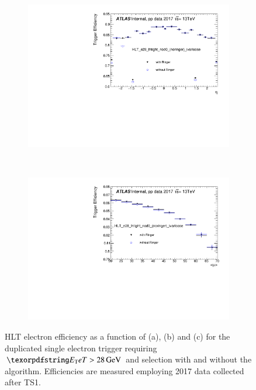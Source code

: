 \begin{figure}[h!tb]
\begin{center}
\begin{subfigure}[c]{.48\textwidth}
  \end{subfigure}
  \hfill
  \begin{subfigure}[c]{.48\textwidth}
  \centering
  \includegraphics[width=\textwidth]{sections/operation/figures/efficiencies/eff_EGAM1_e28_ringer_and_noringer_2017_after_ts1_HLT_eta.pdf}
  \caption{}%
  \end{subfigure} \\
  \begin{subfigure}[c]{.48\textwidth}
  \centering
  \includegraphics[width=\textwidth]{sections/operation/figures/efficiencies/eff_EGAM1_e28_ringer_and_noringer_2017_after_ts1_HLT_mu.pdf}
  \caption{}%
  \label{fig:e28_comp_mu}
  \end{subfigure}
  \caption{\label{fig:e28_triggers}HLT electron efficiency as a function of \et{}
    (a), \eta{} (b) and \avgmu{} (c) for the duplicated single electron trigger
    requiring $\et{} > \SI{28}{\GeV}$ and \tight{} selection with and without the
    \rnn{} algorithm. Efficiencies are measured employing 2017 data collected
    after TS1.}
  \end{center}
\end{figure}
  
